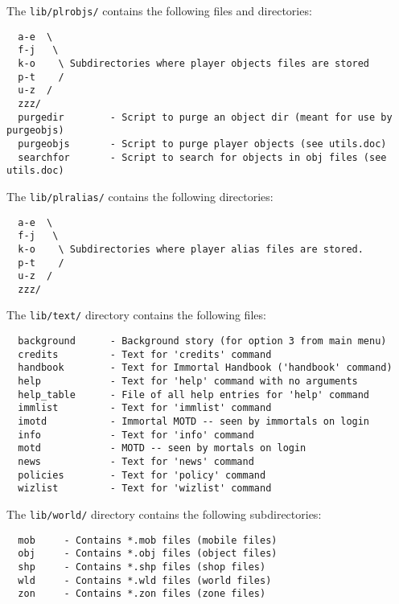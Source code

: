 \documentclass[11pt]{article}
\begin{document}
The \texttt{lib/plrobjs/} contains the following files and directories:
\begin{verbatim}
  a-e  \
  f-j   \
  k-o    \ Subdirectories where player objects files are stored
  p-t    /
  u-z  /
  zzz/
  purgedir        - Script to purge an object dir (meant for use by purgeobjs)
  purgeobjs       - Script to purge player objects (see utils.doc)
  searchfor       - Script to search for objects in obj files (see utils.doc)
\end{verbatim}

The \texttt{lib/plralias/} contains the following directories:
\begin{verbatim}
  a-e  \
  f-j   \
  k-o    \ Subdirectories where player alias files are stored.
  p-t    /
  u-z  /
  zzz/
\end{verbatim}

The \texttt{lib/text/} directory contains the following files:
\begin{verbatim}
  background      - Background story (for option 3 from main menu)
  credits         - Text for 'credits' command
  handbook        - Text for Immortal Handbook ('handbook' command)
  help            - Text for 'help' command with no arguments
  help_table      - File of all help entries for 'help' command
  immlist         - Text for 'immlist' command
  imotd           - Immortal MOTD -- seen by immortals on login
  info            - Text for 'info' command
  motd            - MOTD -- seen by mortals on login
  news            - Text for 'news' command
  policies        - Text for 'policy' command
  wizlist         - Text for 'wizlist' command
\end{verbatim}

The \texttt{lib/world/} directory contains the following subdirectories:
\begin{verbatim}
  mob     - Contains *.mob files (mobile files)
  obj     - Contains *.obj files (object files)
  shp     - Contains *.shp files (shop files)
  wld     - Contains *.wld files (world files)
  zon     - Contains *.zon files (zone files)
\end{verbatim}
\end{document}
